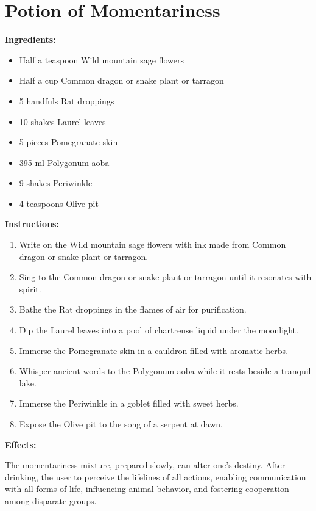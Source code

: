 \documentclass{article}
\begin{document}
\newpage
\section*{Potion of Momentariness}

\textbf{Ingredients:}

\begin{itemize}
  \item Half a teaspoon Wild mountain sage flowers
  \item Half a cup Common dragon or snake plant or tarragon
  \item 5 handfuls Rat droppings
  \item 10 shakes Laurel leaves
  \item 5 pieces Pomegranate skin
  \item 395 ml Polygonum aoba
  \item 9 shakes Periwinkle
  \item 4 teaspoons Olive pit
\end{itemize}

\textbf{Instructions:}

\begin{enumerate}
  \item Write on the Wild mountain sage flowers with ink made from Common dragon or snake plant or tarragon.
  \item Sing to the Common dragon or snake plant or tarragon until it resonates with spirit.
  \item Bathe the Rat droppings in the flames of air for purification.
  \item Dip the Laurel leaves into a pool of chartreuse liquid under the moonlight.
  \item Immerse the Pomegranate skin in a cauldron filled with aromatic herbs.
  \item Whisper ancient words to the Polygonum aoba while it rests beside a tranquil lake.
  \item Immerse the Periwinkle in a goblet filled with sweet herbs.
  \item Expose the Olive pit to the song of a serpent at dawn.
\end{enumerate}

\textbf{Effects:}

The momentariness mixture, prepared slowly, can alter one's destiny. After drinking, the user to perceive the lifelines of all actions, enabling communication with all forms of life, influencing animal behavior, and fostering cooperation among disparate groups.
\end{document}
